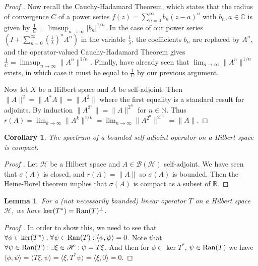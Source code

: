 \documentclass[12pt,oneside]{report}
\newtheorem{cor}[thm]{Corollary}
\newtheorem{lem}[thm]{Lemma}
\begin{document}
\begin{proof}[Proof \cite{Reed_Simon_1980} \cite{Hunter_Nachtergaele_2007}]
    Now recall the Cauchy-Hadamard Theorem, which states that the radius of convergence $C$ of a power series $f(z)= \sum_{n=0}^{\infty} b_{n}(z-a)^{n}$ with $b_{n}, a \in \mathbb{C}$ is given by $\frac{1}{C} = \limsup_{n \to \infty} |b_{n}|^{1/n}$. In the case of our power series $\left( I + \sum_{n=0}^{\infty} \left( \frac{1}{\lambda} \right)^{n}A^{n} \right)$ in the variable $\frac{1}{\lambda}$, the coefficients $b_{n}$ are replaced by $A^{n}$, and the operator-valued Cauchy-Hadamard Theorem gives $\frac{1}{C} = \limsup_{n \to \infty} \|A^{n}\|^{1/n}$. Finally, have already seen that $\lim_{ n \to \infty }\|A^{n}\|^{1/n}$ exists, in which case it must be equal to $\frac{1}{C}$ by our previous argument.

    Now let $X$ be a Hilbert space and $A$ be self-adjoint. Then $\|A\|^{2} = \|A^{*}A\| = \|A^{2}\|$ where the first equality is a standard result for adjoints. By induction $\|A^{2^{n}}\| = \|A\|^{2^{n}}$ for $n \in \mathbb{N}$. Thus $r(A) = \lim_{ k \to \infty } \|A^{k}\|^{1/k} = \lim_{ n \to \infty } \|A^{2^{n}}\|^{2^{-n}} = \|A\|$.
\end{proof}

\begin{cor}
    The spectrum of a bounded self-adjoint operator on a Hilbert space is compact.
\end{cor}
\begin{proof}[Proof \cite{Reed_Simon_1980}]
    Let $\mathscr{H}$ be a Hilbert space and $A \in \mathscr{B}(\mathscr{H})$ self-adjoint. We have seen that $\sigma(A)$ is closed, and $r(A) = \|A\|$ so $\sigma(A)$ is bounded. Then the Heine-Borel theorem implies that $\sigma(A)$ is compact as a subset of $\mathbb{R}$.
\end{proof}

\begin{lem}\label{adjoint-ker-orth-to-operator-range}
    For a (not necessarily bounded) linear operator $T$ on a Hilbert space $\mathscr{H}$, we have $\ker(T^{*}) = \mathrm{Ran}(T)^{\perp}$.
\end{lem}
\begin{proof}[Proof \cite{ludolila_answer_2013}]
    In order to show this, we need to see that $\forall \phi \in \ker(T^{*}): \forall \psi \in \mathrm{Ran}(T): \langle \phi, \psi \rangle = 0$. Note that $\forall \psi \in \mathrm{Ran}(T): \exists \xi \in \mathscr{H}: \psi = T\xi$. And then for $\phi \in \ker{T^*}$, $\psi \in \mathrm{Ran}(T)$ we have $\langle \phi, \psi \rangle = \langle T\xi,\psi \rangle = \langle \xi,T^{*}\psi \rangle = \langle \xi, 0 \rangle = 0$.
\end{proof}
\end{document}
